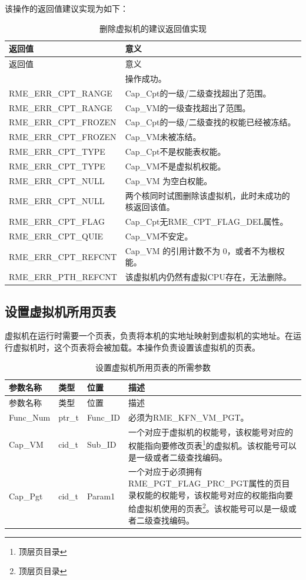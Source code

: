 该操作的返回值建议实现为如下：

\begin{xltabular}{\textwidth}{@{}>{\hsize\raggedright\arraybackslash}X>{\hsize\raggedright\arraybackslash}X@{}}
\caption{删除虚拟机的建议返回值实现}\label{tab:8-76-delete-virtual-machine-suggested-return-values}\\
\toprule
返回值 & 意义\tabularnewline
\endfirsthead
\toprule
返回值 & 意义\tabularnewline
\midrule
\endhead
\bottomrule
{} & 操作成功。\tabularnewline
    RME\_ERR\_CPT\_RANGE & Cap\_Cpt的一级/二级查找超出了范围。\tabularnewline
    RME\_ERR\_CPT\_RANGE & Cap\_VM的一级查找超出了范围。\tabularnewline
    RME\_ERR\_CPT\_FROZEN & Cap\_Cpt的一级/二级查找的权能已经被冻结。\tabularnewline
    RME\_ERR\_CPT\_FROZEN & Cap\_VM未被冻结。\tabularnewline
    RME\_ERR\_CPT\_TYPE & Cap\_Cpt不是权能表权能。\tabularnewline
    RME\_ERR\_CPT\_TYPE & Cap\_VM不是虚拟机权能。\tabularnewline
    RME\_ERR\_CPT\_NULL & Cap\_VM 为空白权能。\tabularnewline
    RME\_ERR\_CPT\_NULL & 两个核同时试图删除该虚拟机，此时未成功的核返回该值。\tabularnewline
    RME\_ERR\_CPT\_FLAG & Cap\_Cpt无RME\_CPT\_FLAG\_DEL属性。\tabularnewline
    RME\_ERR\_CPT\_QUIE & Cap\_VM不安定。\tabularnewline
    RME\_ERR\_CPT\_REFCNT & Cap\_VM 的引用计数不为 0，或者不为根权能。\tabularnewline
    RME\_ERR\_PTH\_REFCNT & 该虚拟机内仍然有虚拟CPU存在，无法删除。\tabularnewline
\end{xltabular}

\subsection{设置虚拟机所用页表}\label{subsec:8-set-virtual-machine-page-table}

虚拟机在运行时需要一个页表，负责将本机的实地址映射到虚拟机的实地址。在运行虚拟机时，这个页表将会被加载。本操作负责设置该虚拟机的页表。

\begin{xltabular}{\textwidth}{@{}>{\hsize\raggedright\arraybackslash}X>{\hsize\raggedright\arraybackslash}X>{\hsize\raggedright\arraybackslash}X>{\hsize\raggedright\arraybackslash}X@{}}
\caption{设置虚拟机所用页表的所需参数}\label{tab:8-77-set-virtual-machine-page-table-parameters}\\
\toprule
参数名称 & 类型 & 位置 & 描述\tabularnewline
\endfirsthead
\toprule
参数名称 & 类型 & 位置 & 描述\tabularnewline
\midrule
\endhead
\bottomrule
\endlastfoot
Func\_Num & ptr\_t & Func\_ID & 必须为RME\_KFN\_VM\_PGT。\tabularnewline
Cap\_VM & cid\_t & Sub\_ID &
一个对应于虚拟机的权能号，该权能号对应的权能指向要修改页表\footnote{顶层页目录}的虚拟机。该权能号可以是一级或者二级查找编码。\tabularnewline
Cap\_Pgt & cid\_t & Param1 &
一个对应于必须拥有RME\_PGT\_FLAG\_PRC\_PGT属性的页目录权能的权能号，该权能号对应的权能指向要给虚拟机使用的页表\footnote{顶层页目录}。该权能号可以是一级或者二级查找编码。\tabularnewline
\end{xltabular}

